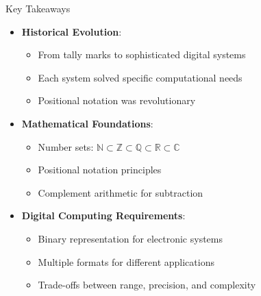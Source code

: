 \documentclass[aspectratio=169,11pt]{beamer}
\newcommand{\concept}[1]{\textbf{\color{accentcolor}#1}}
\begin{document}
\begin{frame}{Key Takeaways}
\begin{itemize}
\item \concept{Historical Evolution}:
\begin{itemize}
\item From tally marks to sophisticated digital systems
\item Each system solved specific computational needs
\item Positional notation was revolutionary
\end{itemize}
\vspace{0.3cm}
\item \concept{Mathematical Foundations}:
\begin{itemize}
\item Number sets: $\mathbb{N} \subset \mathbb{Z} \subset \mathbb{Q} \subset \mathbb{R} \subset \mathbb{C}$
\item Positional notation principles
\item Complement arithmetic for subtraction
\end{itemize}
\vspace{0.3cm}
\item \concept{Digital Computing Requirements}:
\begin{itemize}
\item Binary representation for electronic systems
\item Multiple formats for different applications
\item Trade-offs between range, precision, and complexity
\end{itemize}
\end{itemize}
\end{frame}
\end{document}
